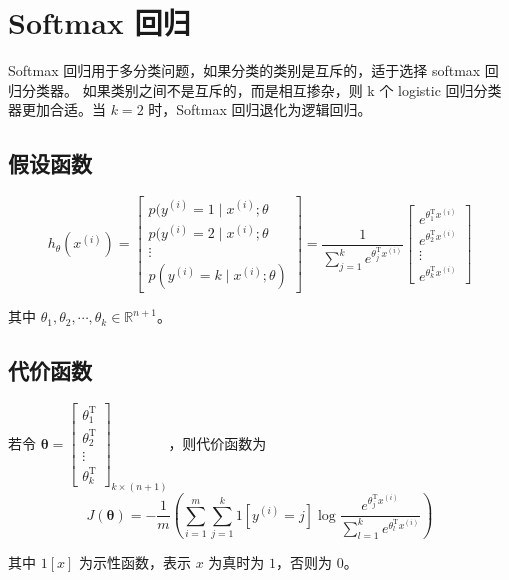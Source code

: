 \section{Softmax 回归}

Softmax 回归用于多分类问题，如果分类的类别是互斥的，适于选择 softmax 回归分类器。
如果类别之间不是互斥的，而是相互掺杂，则 k 个 logistic 回归分类器更加合适。当 $k = 2$ 时，Softmax 回归退化为逻辑回归。

\subsection{假设函数}
\begin{equation}
    h_\theta\left(x^{(i)}\right) = 
\begin{bmatrix}
p(y^{(i)}=1 \mid x^{(i)};\theta \\
p(y^{(i)}=2 \mid x^{(i)};\theta \\
\vdots \\
p(y^{(i)}=k \mid x^{(i)};\theta)
\end{bmatrix}
= \dfrac{1}{\sum_{j=1}^k e^{\theta_j^\mathrm Tx^{(i)}}}
\begin{bmatrix}
e^{\theta_1^\mathrm Tx^{(i)}} \\
e^{\theta_2^\mathrm Tx^{(i)}} \\
\vdots \\
e^{\theta_k^\mathrm Tx^{(i)}}
\end{bmatrix}
\end{equation}

其中 $\theta_1, \theta_2, \cdots, \theta_k \in \mathbb{R}^{n+1}$。

\subsection{代价函数}
若令 $\boldsymbol{\theta} =
\begin{bmatrix}
\theta_1^\mathrm T \\
\theta_2^\mathrm T \\
\vdots \\
\theta_k^\mathrm T
\end{bmatrix}_{k \times (n + 1)}$，则代价函数为
\begin{equation}
    J(\boldsymbol{\theta}) = -\dfrac 1m \left(\sum_{i=1}^m\sum_{j=1}^k1\left[y^{(i)} = j\right]\log 
    \dfrac{e^{\theta_j^\mathrm Tx^{(i)}}}{\sum_{l=1}^k e^{\theta_l^\mathrm Tx^{(i)}}}\right)
\end{equation}

其中 $1[x]$ 为示性函数，表示 $x$ 为真时为 $1$，否则为 $0$。

